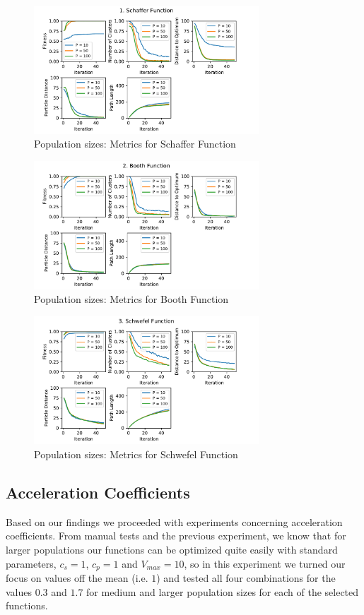 \documentclass[12pt]{article}
\begin{document}
\begin{figure}[h!]
	\centering
	\includegraphics[width=0.75\textwidth]{figures/ex2/ex2-1.pdf}
	\caption{Population sizes: Metrics for Schaffer Function}
	\label{fig:ex2-1}
\end{figure}
\begin{figure}[h!]
	\centering
	\includegraphics[width=0.75\textwidth]{figures/ex2/ex2-2.pdf}
	\caption{Population sizes: Metrics for Booth Function}
	\label{fig:ex2-2}
\end{figure}
\begin{figure}[h!]
	\centering
	\includegraphics[width=0.75\textwidth]{figures/ex2/ex2-3.pdf}
	\caption{Population sizes: Metrics for Schwefel Function}
	\label{fig:ex2-3}
\end{figure}

\FloatBarrier
\subsection{Acceleration Coefficients}
Based on our findings we proceeded with experiments concerning acceleration coefficients. 
From manual tests and the previous experiment, we know that for larger populations our functions can be optimized quite easily with standard parameters, $c_s=1$, $c_p=1$ and $V_{max}=10$, so in this experiment we turned our focus on values off the mean (i.e. $1$) and tested all four combinations for the values $0.3$ and $1.7$ for medium and larger population sizes for each of the selected functions. 
\end{document}
